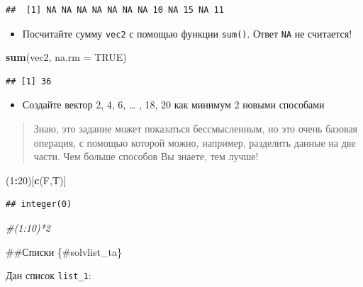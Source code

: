 \documentclass[]{book}
\newenvironment{Shaded}{\begin{snugshade}}{\end{snugshade}}
\newcommand{\CommentTok}[1]{\textcolor[rgb]{0.56,0.35,0.01}{\textit{#1}}}
\newcommand{\DataTypeTok}[1]{\textcolor[rgb]{0.13,0.29,0.53}{#1}}
\newcommand{\DecValTok}[1]{\textcolor[rgb]{0.00,0.00,0.81}{#1}}
\newcommand{\KeywordTok}[1]{\textcolor[rgb]{0.13,0.29,0.53}{\textbf{#1}}}
\newcommand{\NormalTok}[1]{#1}
\newcommand{\OperatorTok}[1]{\textcolor[rgb]{0.81,0.36,0.00}{\textbf{#1}}}
\newcommand{\OtherTok}[1]{\textcolor[rgb]{0.56,0.35,0.01}{#1}}
\providecommand{\tightlist}{%
  \setlength{\itemsep}{0pt}\setlength{\parskip}{0pt}}
\begin{document}
\begin{verbatim}
##  [1] NA NA NA NA NA NA NA 10 NA 15 NA 11
\end{verbatim}

\begin{itemize}
\tightlist
\item
  Посчитайте сумму \texttt{vec2} с помощью функции \texttt{sum()}. Ответ \texttt{NA} не считается!
\end{itemize}

\begin{Shaded}
\begin{Highlighting}[]
\KeywordTok{sum}\NormalTok{(vec2, }\DataTypeTok{na.rm =} \OtherTok{TRUE}\NormalTok{)}
\end{Highlighting}
\end{Shaded}

\begin{verbatim}
## [1] 36
\end{verbatim}

\begin{itemize}
\tightlist
\item
  Создайте вектор 2, 4, 6, \ldots{} , 18, 20 как минимум 2 новыми способами
\end{itemize}

\begin{quote}
Знаю, это задание может показаться бессмысленным, но это очень базовая операция, с помощью которой можно, например, разделить данные на две части. Чем больше способов Вы знаете, тем лучше!
\end{quote}

\begin{Shaded}
\begin{Highlighting}[]
\NormalTok{(}\DecValTok{1}\OperatorTok{:}\DecValTok{20}\NormalTok{)[}\KeywordTok{c}\NormalTok{(F,T)]}
\end{Highlighting}
\end{Shaded}

\begin{verbatim}
## integer(0)
\end{verbatim}

\begin{Shaded}
\begin{Highlighting}[]
\CommentTok{#(1:10)*2}
\end{Highlighting}
\end{Shaded}

\#\#Списки \{\#solvlist\_ta\}

Дан список \texttt{list\_1}:
\end{document}
